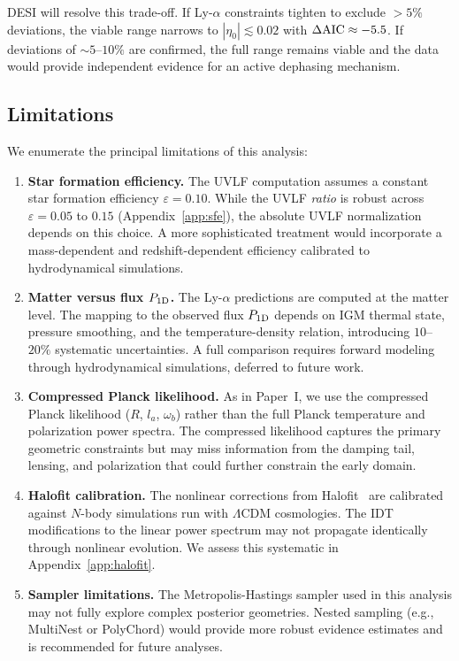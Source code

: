 \documentclass[aps,prd,twocolumn,superscriptaddress,nofootinbib]{revtex4-2}
\newcommand{\dAIC}{\Delta{\rm AIC}}
\begin{document}
DESI will resolve this trade-off. If Ly-$\alpha$ constraints tighten
to exclude $> 5\%$ deviations, the viable range narrows to
$|\eta_0| \lesssim 0.02$ with $\dAIC \approx -5.5$. If deviations
of $\sim 5$--$10\%$ are confirmed, the full range remains viable
and the data would provide independent evidence for an active
dephasing mechanism.

\subsection{Limitations}
\label{sec:limitations}

We enumerate the principal limitations of this analysis:

\begin{enumerate}
\item \textbf{Star formation efficiency.} The UVLF computation
assumes a constant star formation efficiency $\varepsilon = 0.10$.
While the UVLF \emph{ratio} is robust across $\varepsilon = 0.05$
to $0.15$ (Appendix~\ref{app:sfe}), the absolute UVLF normalization
depends on this choice. A more sophisticated treatment would
incorporate a mass-dependent and redshift-dependent efficiency
calibrated to hydrodynamical simulations.

\item \textbf{Matter versus flux $P_{1{\rm D}}$.} The Ly-$\alpha$
predictions are computed at the matter level. The mapping to the
observed flux $P_{1{\rm D}}$ depends on IGM thermal state, pressure
smoothing, and the temperature-density relation, introducing
$10$--$20\%$ systematic uncertainties. A full comparison requires
forward modeling through hydrodynamical simulations, deferred to
future work.

\item \textbf{Compressed Planck likelihood.} As in Paper~I, we use
the compressed Planck likelihood ($R$, $l_a$, $\omega_b$) rather
than the full Planck temperature and polarization power spectra.
The compressed likelihood captures the primary geometric constraints
but may miss information from the damping tail, lensing, and
polarization that could further constrain the early domain.

\item \textbf{Halofit calibration.} The nonlinear corrections from
Halofit~\cite{Smith2020} are calibrated against $N$-body simulations
run with $\Lambda$CDM cosmologies. The IDT modifications to the
linear power spectrum may not propagate identically through
nonlinear evolution. We assess this systematic in
Appendix~\ref{app:halofit}.

\item \textbf{Sampler limitations.} The Metropolis-Hastings sampler
used in this analysis may not fully explore complex posterior
geometries. Nested sampling (e.g., MultiNest or PolyChord) would
provide more robust evidence estimates and is recommended for
future analyses.
\end{enumerate}
\end{document}
